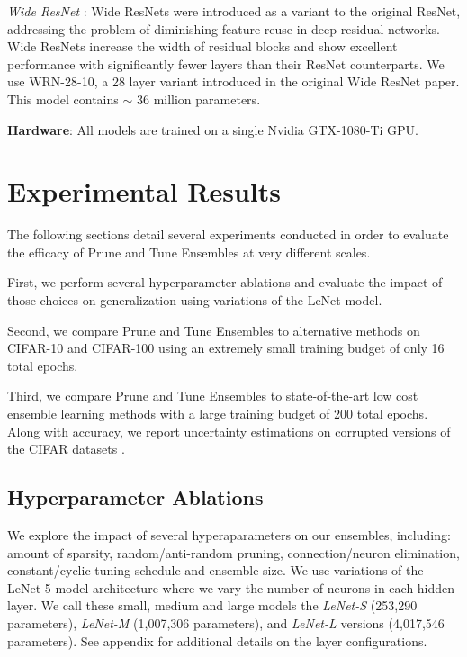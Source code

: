 \documentclass[letterpaper]{article} %
\begin{document}
\textit{Wide ResNet} \cite{zagoruyko2017wide}: Wide ResNets were introduced as a variant to the original ResNet, addressing the problem of diminishing feature reuse in deep residual networks. Wide ResNets increase the width of residual blocks and show excellent performance with significantly fewer layers than their ResNet counterparts. We use WRN-28-10, a 28 layer variant introduced in the original Wide ResNet paper. This model contains $\sim$ 36 million parameters.

\textbf{Hardware}: All models are trained on a single Nvidia GTX-1080-Ti GPU.

\section{Experimental Results}

The following sections detail several experiments conducted in order to evaluate the efficacy of Prune and Tune Ensembles at very different scales. 

First, we perform several hyperparameter ablations and evaluate the impact of those choices on generalization using variations of the LeNet model. 

Second, we compare Prune and Tune Ensembles to alternative methods on CIFAR-10 and CIFAR-100 using an extremely small training budget of only 16 total epochs.

Third, we compare Prune and Tune Ensembles to state-of-the-art low cost ensemble learning methods with a large training budget of 200 total epochs. Along with accuracy, we report uncertainty estimations on corrupted versions of the CIFAR datasets \cite{nado2021uncertainty, hendrycks2019robustness}.

\subsection{Hyperparameter Ablations}

We explore the impact of several hyperaparameters on our ensembles, including: amount of sparsity, random/anti-random pruning, connection/neuron elimination, constant/cyclic tuning schedule and ensemble size. We use variations of the LeNet-5 model architecture where we vary the number of neurons in each hidden layer. We call these small, medium and large models the {\it LeNet-S} (253,290 parameters), {\it LeNet-M} (1,007,306 parameters), and {\it LeNet-L} versions (4,017,546 parameters). See appendix for additional details on the layer configurations.
\end{document}
